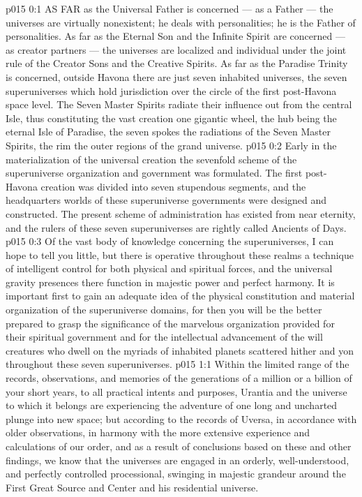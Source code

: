 \vs p015 0:1 AS FAR as the Universal Father is concerned --- as a Father --- the universes are virtually nonexistent; he deals with personalities; he is the Father of personalities. As far as the Eternal Son and the Infinite Spirit are concerned --- as creator partners --- the universes are localized and individual under the joint rule of the Creator Sons and the Creative Spirits. As far as the Paradise Trinity is concerned, outside Havona there are just seven inhabited universes, the seven superuniverses which hold jurisdiction over the circle of the first post\hyp{}Havona space level. The Seven Master Spirits radiate their influence out from the central Isle, thus constituting the vast creation one gigantic wheel, the hub being the eternal Isle of Paradise, the seven spokes the radiations of the Seven Master Spirits, the rim the outer regions of the grand universe.
\vs p015 0:2 Early in the materialization of the universal creation the sevenfold scheme of the superuniverse organization and government was formulated. The first post\hyp{}Havona creation was divided into seven stupendous segments, and the headquarters worlds of these superuniverse governments were designed and constructed. The present scheme of administration has existed from near eternity, and the rulers of these seven superuniverses are rightly called Ancients of Days.
\vs p015 0:3 Of the vast body of knowledge concerning the superuniverses, I can hope to tell you little, but there is operative throughout these realms a technique of intelligent control for both physical and spiritual forces, and the universal gravity presences there function in majestic power and perfect harmony. It is important first to gain an adequate idea of the physical constitution and material organization of the superuniverse domains, for then you will be the better prepared to grasp the significance of the marvelous organization provided for their spiritual government and for the intellectual advancement of the will creatures who dwell on the myriads of inhabited planets scattered hither and yon throughout these seven superuniverses.
\vs p015 1:1 Within the limited range of the records, observations, and memories of the generations of a million or a billion of your short years, to all practical intents and purposes, Urantia and the universe to which it belongs are experiencing the adventure of one long and uncharted plunge into new space; but according to the records of Uversa, in accordance with older observations, in harmony with the more extensive experience and calculations of our order, and as a result of conclusions based on these and other findings, we know that the universes are engaged in an orderly, well\hyp{}understood, and perfectly controlled processional, swinging in majestic grandeur around the First Great Source and Center and his residential universe.
